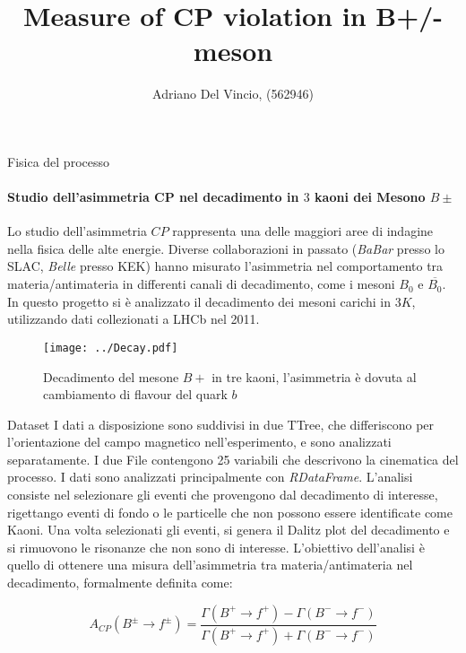 \documentclass[8pt,a4paper]{beamer}
\author{Adriano Del Vincio, (562946)}
\title{Measure of CP violation in B+/- meson}
\begin{document}
\frame{\titlepage}

\begin{frame}{Fisica del processo}
\framesubtitle{Studio dell'asimmetria CP nel decadimento in $3$ kaoni dei Mesono $B\pm$}

Lo studio dell'asimmetria $CP$ rappresenta una delle maggiori aree di indagine nella fisica delle alte energie. Diverse collaborazioni in passato (\textit{BaBar} presso lo SLAC, \textit{Belle} presso KEK) hanno misurato l'asimmetria nel comportamento tra materia/antimateria in differenti canali di decadimento, come i mesoni $B_{0}$ e $\overline{B_{0}}$. In questo progetto si è analizzato il decadimento dei mesoni carichi in  $3 K$, utilizzando dati collezionati a LHCb nel 2011.

\begin{figure}[hbtp]
\centering
\texttt{[image: ../Decay.pdf]}
\caption{Decadimento del mesone $B+$ in tre kaoni, l'asimmetria è dovuta al cambiamento di flavour del quark $b$}
\end{figure}
\end{frame}

\begin{frame}{Dataset}
I dati a disposizione sono suddivisi in due TTree, che differiscono per l'orientazione del campo magnetico nell'esperimento, e sono analizzati separatamente. I due File contengono 25 variabili che descrivono la cinematica del processo.
I dati sono analizzati principalmente con \textit{RDataFrame}. L'analisi consiste nel selezionare gli eventi che provengono dal decadimento di interesse, rigettango eventi di fondo o le particelle che non possono essere identificate come Kaoni. Una volta selezionati gli eventi, si genera il Dalitz plot del decadimento e si rimuovono le risonanze che non sono di interesse. L'obiettivo dell'analisi è quello di ottenere una misura dell'asimmetria tra materia/antimateria nel decadimento, formalmente definita come:

\begin{equation}
A_{CP}(B^{\pm} \rightarrow f^{\pm}) = \dfrac{\Gamma(B^{+} \rightarrow f^{+}) - \Gamma(B^{-} \rightarrow f^{-})}{ \Gamma(B^{+} \rightarrow f^{+}) + \Gamma(B^{-} \rightarrow f^{-})}
\end{equation}
\end{frame}
\end{document}
